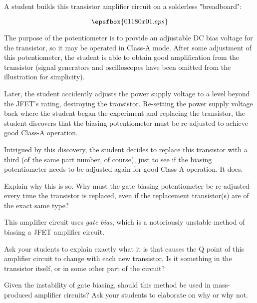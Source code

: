 

A student builds this transistor amplifier circuit on a solderless "breadboard":

$$\epsfbox{01180x01.eps}$$

The purpose of the potentiometer is to provide an adjustable DC bias voltage for the transistor, so it may be operated in Class-A mode.  After some adjustment of this potentiometer, the student is able to obtain good amplification from the transistor (signal generators and oscilloscopes have been omitted from the illustration for simplicity).

Later, the student accidently adjusts the power supply voltage to a level beyond the JFET's rating, destroying the transistor.  Re-setting the power supply voltage back where the student began the experiment and replacing the transistor, the student discovers that the biasing potentiometer must be re-adjusted to achieve good Class-A operation.

Intrigued by this discovery, the student decides to replace this transistor with a third (of the same part number, of course), just to see if the biasing potentiometer needs to be adjusted again for good Class-A operation.  It does.  

Explain why this is so.  Why must the gate biasing potentiometer be re-adjusted every time the transistor is replaced, even if the replacement transistor(s) are of the exact same type?







This amplifier circuit uses {\it gate bias}, which is a notoriously unstable method of biasing a JFET amplifier circuit.







Ask your students to explain exactly what it is that causes the Q point of this amplifier circuit to change with each new transistor.  Is it something in the transistor itself, or in some other part of the circuit?  

Given the instability of gate biasing, should this method be used in mass-produced amplifier circuits?  Ask your students to elaborate on why or why not.




